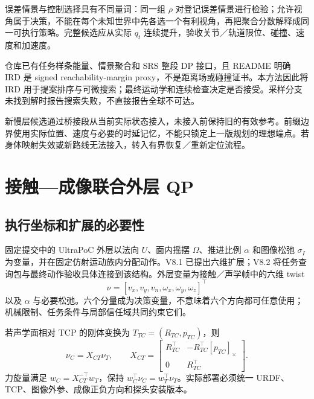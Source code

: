 \documentclass[UTF8,11pt,a4paper,fontset=fandol]{ctexart}
\numberwithin{equation}{section}
\theoremstyle{definition}
\newcommand{\sk}[1]{[#1]_{\times}}
\begin{document}
误差情景与控制选择具有不同量词：同一组 $\rho$ 对登记误差情景进行检验；允许视角属于决策，不能在每个未知世界中先各选一个有利视角，再把聚合分数解释成同一可执行策略。完整候选应从实际 $q_t$ 连续提升，验收关节／轨道限位、碰撞、速度和加速度。

仓库已有任务样条能量、情景聚合和 SRS 整段 DP 接口，且 README 明确 IRD 是 signed reachability-margin proxy，不是距离场或碰撞证书\cite{repoird,reposrs}。本方法因此将 IRD 用于提案排序与可微搜索；最终运动学和连续检查决定是否接受。采样分支未找到解时报告搜索失败，不直接报告全球不可达。

新慢层候选通过桥接段从当前实际状态接入，未接入前保持旧的有效参考。前缀边界使用实际位置、速度与必要的时延记忆，不能只锁定上一版规划的理想端点。若身体映射失效或新路线无法接入，转入有界恢复／重新定位流程。

\section{接触—成像联合外层 QP}
\label{sec:qp}
\subsection{执行坐标和扩展的必要性}
固定提交中的 UltraPoC 外层以法向 $U$、面内摇摆 $\Omega$、推进比例 $\alpha$ 和图像松弛 $\sigma_I$ 为变量，并在固定仿射运动族内分配动作\cite{repoouter,repogeom}。V8.1 已提出六维扩展；V8.2 将任务查询包与最终动作验收具体连接到该结构。外层变量为接触／声学帧中的六维 twist
\begin{equation}
\nu=[v_x,v_y,v_n,\omega_x,\omega_y,\omega_z]^\top
\label{eq:twist}
\end{equation}
以及 $\alpha$ 与必要松弛。六个分量成为决策变量，不意味着六个方向都可任意使用；机械限制、任务条件与局部信任域共同约束它们。

若声学面相对 TCP 的刚体变换为 $T_{TC}=(R_{TC},p_{TC})$，则
\begin{equation}
\nu_C=X_{CT}\nu_T,\qquad
X_{CT}=
\begin{bmatrix}
R_{TC}^{\top}&-R_{TC}^{\top}\sk{p_{TC}}\\
0&R_{TC}^{\top}
\end{bmatrix}.
\label{eq:twisttransform}
\end{equation}
力旋量满足 $w_C=X_{CT}^{-\top}w_T$，保持 $w_C^\top\nu_C=w_T^\top\nu_T$。实际部署必须统一 URDF、TCP、图像外参、成像正负方向和探头安装版本。
\end{document}
